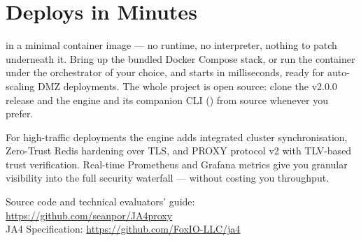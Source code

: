 \section{Deploys in Minutes}

 in a minimal
container image --- no runtime, no interpreter, nothing to patch underneath it.
Bring up the bundled Docker Compose stack, or run the container under the
orchestrator of your choice, and  starts in milliseconds, ready for
auto-scaling DMZ deployments. The whole project is open source: clone the v2.0.0
release and  the engine and its companion CLI () from
source whenever you prefer.

For high-traffic deployments the engine adds integrated cluster
synchronisation, Zero-Trust Redis hardening over TLS, and PROXY protocol v2 with
TLV-based trust verification. Real-time Prometheus and Grafana metrics give you
granular visibility into the full security waterfall --- without costing you
throughput.

\vspace{\baselineskip}
{\small\sffamily\color{ja4gray}
Source code and technical evaluators' guide:\\
\url{https://github.com/seanpor/JA4proxy}\\[2pt]
JA4 Specification: \url{https://github.com/FoxIO-LLC/ja4}
}
